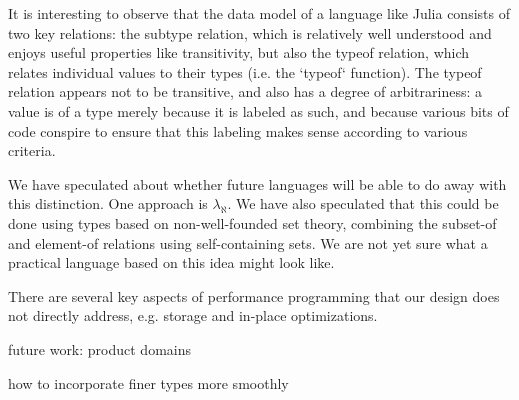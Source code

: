 It is interesting to observe that the data model of a language like Julia
consists of two key relations: the subtype relation, which is relatively
well understood and enjoys useful properties like transitivity, but also
the typeof relation, which relates individual values to their types
(i.e. the `typeof` function). The typeof relation appears not to be
transitive, and also has a degree of arbitrariness: a value is of a type
merely because it is labeled as such, and because various bits of code
conspire to ensure that this labeling makes sense according to various
criteria.

We have speculated about whether future languages will be able to do away
with this distinction. One approach is $\lambda_{\aleph}$. We have also
speculated that this could be done using types based on non-well-founded
set theory, combining the subset-of and element-of relations using
self-containing sets. We are not yet sure what a practical language based
on this idea might look like.


There are several key aspects of performance programming that our design
does not directly address, e.g.  storage and in-place optimizations.

future work:
product domains

how to incorporate finer types more smoothly



